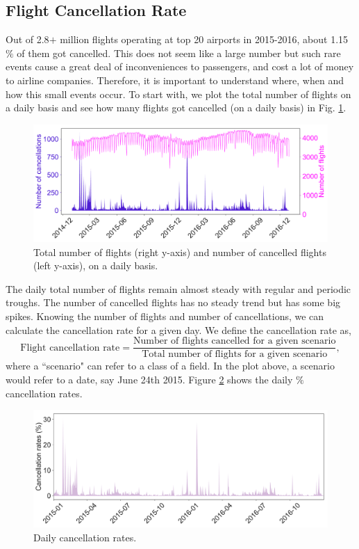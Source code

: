 \documentclass[12pt]{article}
\begin{document}
\subsection{Flight Cancellation Rate}
\label{subsec:canrate}
Out of 2.8$+$ million flights operating at top 20 airports in 2015-2016, about 1.15$\%$ of them got cancelled. This does not seem like a large number but such rare events cause a great deal of inconveniences to passengers, and cost a lot of money to airline companies. Therefore, it is important to understand where, when and how this small events occur. To start with, we plot the total number of flights on a daily basis and see how many flights got cancelled (on a daily basis) in Fig. \ref{fig:daily}. 
\begin{figure}[h!]
\begin{center}
\includegraphics[width=6in]{daily_flights_cancellations.pdf}
\end{center}
\caption{\label{fig:daily}
Total number of flights (right y-axis) and number of cancelled flights (left y-axis), on a daily basis.}
\end{figure}
The daily total number of flights remain almost steady with regular and periodic troughs. The number of cancelled flights has no steady trend but has some big spikes. Knowing the number of flights and number of cancellations, we can calculate the cancellation rate for a given day. We define the cancellation rate as, 
\begin{equation}
\label{eq:canrate}
\text{Flight cancellation rate} = \frac{\text{Number of flights cancelled for a given scenario}}{\text{Total number of flights for a given scenario}},
\end{equation}
where a ``scenario" can refer to a class of a field. In the plot above, a scenario would refer to a date, say June 24th 2015. Figure \ref{fig:dailycanrate} shows the daily $\%$ cancellation rates.  
\begin{figure}[h!]
\begin{center}
\includegraphics[width=6in]{daily_canrate.pdf}
\end{center}
\caption{\label{fig:dailycanrate}
Daily cancellation rates.}
\end{figure}
\end{document}
